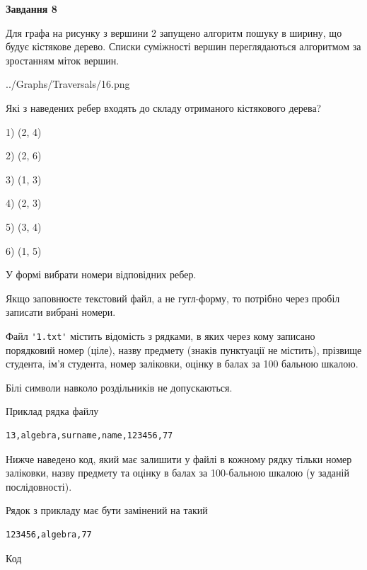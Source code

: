 \documentclass[12pt, ukrainian]{article}
\def\code#1{\Verb!#1!}
\begin{document}
{\begin {large}
{\begin {center}\textbf{Завдання 8}\end {center}}\par
Для графа на рисунку з вершини 2 запущено алгоритм пошуку в ширину, що будує кістякове дерево. Списки суміжності вершин переглядаються алгоритмом за зростанням міток вершин.\par
\begin{center}
	{../Graphs/Traversals/16.png}
\end{center}
\par Які з наведених ребер входять до складу отриманого кістякового дерева?\par
1) (2, 4)\par
2) (2, 6)\par
3) (1, 3)\par
4) (2, 3)\par
5) (3, 4)\par
6) (1, 5)\par
{\vskip 15pt} У формі вибрати номери відповідних ребер.


Якщо заповнюєте текстовий файл, а не гугл-форму, то потрібно через пробіл записа\-ти вибрані номери.\par
\newpage


Файл \code{'1.txt'} містить відомість з рядками, в яких через кому записа\-но поряд\-ковий номер (ціле), назву предмету (знаків пунктуації не містить), прізвище студента, ім'я студента, номер заліковки, оцінку в балах за 100 бальною шкалою.

Білі символи навколо роздільників не допускаються.

Приклад рядка файлу



\begin{verbatim}
13,algebra,surname,name,123456,77
\end{verbatim}


Нижче наведено код, який має залишити у файлі в кожному рядку тільки номер заліковки, назву предмету та оцінку в балах за 100-бальною шкалою (у заданій послі\-дов\-ності).

Рядок з прикладу має бути замінений на такий



\begin{verbatim}
123456,algebra,77
\end{verbatim}




Код




\end{large}}
\end{document}
